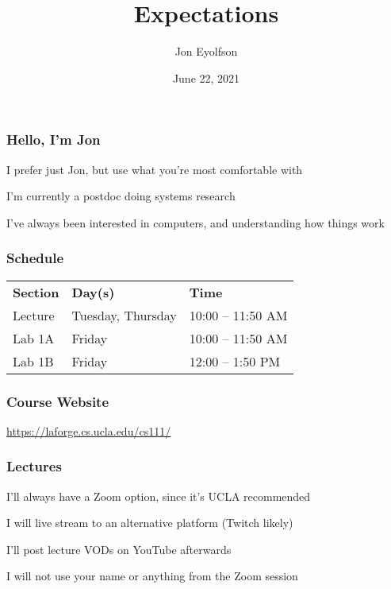 

\title{Expectations}
\author{Jon Eyolfson}
\date{June 22, 2021}


  \begin{frame}
    \titlepage
  \end{frame}

  \begin{frame}
    \frametitle{Hello, I'm Jon}

    I prefer just Jon, but use what you're most comfortable with

    \vspace{2em}

    I'm currently a postdoc doing systems research

    \vspace{2em}

    I've always been interested in computers, and understanding how things work
  \end{frame}

  \begin{frame}
    \frametitle{Schedule}

    \begin{tabular}{lll}
      \textbf{Section} & \textbf{Day(s)}   & \textbf{Time}     \\
      Lecture          & Tuesday, Thursday & 10:00 -- 11:50 AM \\
      Lab 1A           & Friday            & 10:00 -- 11:50 AM \\
      Lab 1B           & Friday            & 12:00 -- 1:50 PM  \\
    \end{tabular}
  \end{frame}

  \begin{frame}
    \frametitle{Course Website}

    \url{https://laforge.cs.ucla.edu/cs111/}
  \end{frame}

  \begin{frame}
    \frametitle{Lectures}

    I'll always have a Zoom option, since it's UCLA recommended

    \vspace{2em}

    I will live stream to an alternative platform (Twitch likely)

    \vspace{2em}

    I'll post lecture VODs on YouTube afterwards

    \vspace{2em}

    I will not use your name or anything from the Zoom session
  \end{frame}

